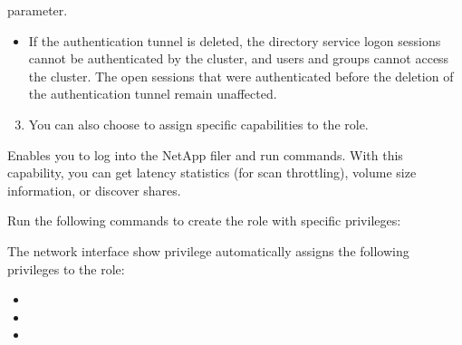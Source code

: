 \documentclass[letterpaper,10pt,english]{sphinxmanual}
\begin{document}
 parameter.
\begin{itemize}
\item {} 
If the authentication tunnel is deleted, the directory service logon sessions cannot be authenticated by the cluster, and users and groups cannot access the cluster. The open sessions that were authenticated before the deletion of the authentication tunnel remain unaffected.

\end{itemize}
\begin{enumerate}
\setcounter{enumi}{2}
\item {} 
You can also choose to assign specific capabilities to the role.

\end{enumerate}


Enables you to log into the NetApp filer and run commands. With this capability, you can get latency statistics (for scan throttling), volume size information, or discover shares.

Run the following commands to create the role with specific privileges:








The network interface show privilege automatically assigns the following privileges to the role:
\begin{itemize}
\item {} 

\item {} 

\item {} 

\end{itemize}
\end{document}
